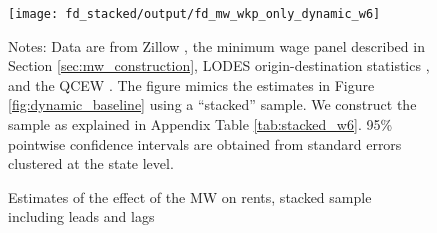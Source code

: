 
\begin{figure}[h!]
    \centering
    \caption{Estimates of the effect of the MW on rents, stacked sample including
             leads and lags}
    \label{fig:dynamic_stacked}

    \texttt{[image: fd\_stacked/output/fd\_mw\_wkp\_only\_dynamic\_w6]}

    \begin{minipage}{.95\textwidth} \footnotesize
        \vspace{3mm}
        Notes:
        Data are from Zillow \parencite{ZillowData},
        the minimum wage panel described in Section \ref{sec:mw_construction}, 
        LODES origin-destination statistics \parencite{CensusLODES},
        and the QCEW \parencite{QCEW}.
        The figure mimics the estimates in Figure \ref{fig:dynamic_baseline} 
        using a ``stacked'' sample.
        We construct the sample as explained in Appendix Table \ref{tab:stacked_w6}.
        95\% pointwise confidence intervals are obtained from standard errors 
        clustered at the state level.
    \end{minipage}
\end{figure}
